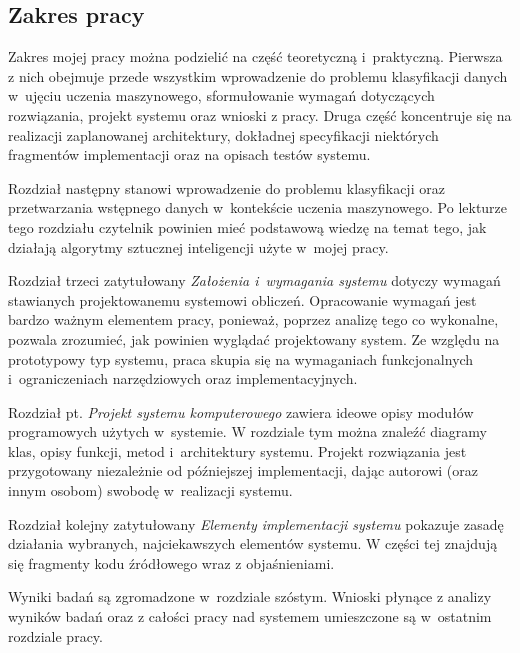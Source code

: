 \documentclass[../thesis.tex]{subfiles}
\begin{document}
\subsection{Zakres pracy}

Zakres mojej pracy można podzielić na część teoretyczną i~praktyczną. Pierwsza z nich obejmuje przede wszystkim wprowadzenie do problemu klasyfikacji danych w~ujęciu uczenia maszynowego, sformułowanie wymagań dotyczących rozwiązania, projekt systemu oraz wnioski z pracy. Druga część koncentruje się na realizacji zaplanowanej architektury, dokładnej specyfikacji niektórych fragmentów implementacji oraz na opisach testów systemu. 

Rozdział następny stanowi wprowadzenie do problemu klasyfikacji oraz przetwarzania wstępnego danych w~kontekście uczenia maszynowego. Po lekturze tego rozdziału czytelnik powinien mieć podstawową wiedzę na temat tego, jak działają algorytmy sztucznej inteligencji użyte w~mojej pracy.

Rozdział trzeci zatytułowany \emph{Założenia i~wymagania systemu} dotyczy wymagań stawianych projektowanemu systemowi obliczeń. Opracowanie wymagań jest bardzo ważnym elementem pracy, ponieważ, poprzez analizę tego co wykonalne, pozwala zrozumieć, jak powinien wyglądać projektowany system. Ze względu na prototypowy typ systemu, praca skupia się na wymaganiach funkcjonalnych i~ograniczeniach narzędziowych oraz implementacyjnych.

Rozdział pt. \emph{Projekt systemu komputerowego} zawiera ideowe opisy modułów programowych użytych w~systemie. W rozdziale tym można znaleźć diagramy klas, opisy funkcji, metod i~architektury systemu. Projekt rozwiązania jest przygotowany niezależnie od późniejszej implementacji, dając autorowi (oraz innym osobom) swobodę w~realizacji systemu.

Rozdział kolejny zatytułowany \emph{Elementy implementacji systemu} pokazuje zasadę działania wybranych, najciekawszych elementów systemu. W części tej znajdują się fragmenty kodu źródłowego wraz z objaśnieniami.

Wyniki badań są zgromadzone w~rozdziale szóstym. Wnioski płynące z analizy wyników badań oraz z całości pracy nad systemem umieszczone są w~ostatnim rozdziale pracy.
\end{document}
